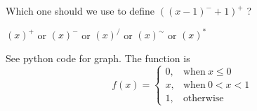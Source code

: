 \documentclass[12pt]{simple_doc}
\begin{document}
    \medskip
    Which one should we use to define $((x-1)^- + 1)^+$ ?
    \begin{center}
        $(x)^+$ or $(x)^-$ or $(x)^{/}$ or $(x)^{\sim}$  or $(x)^{*}$
    \end{center}
    See python code for graph. The function is
     \begin{equation}
        f(x) =
            \begin{cases}
              0, & \text{when}\ x \leqslant 0\\
              x, & \text{when}\ 0 < x < 1\\
              1, & \text{otherwise}
            \end{cases}
    \end{equation}
\end{document}
